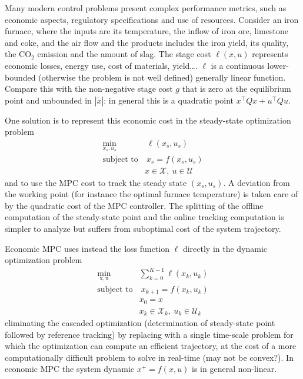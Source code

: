 \documentclass[11pt]{report}
\newcommand{\bs}[1]{\boldsymbol{#1}}
\newcommand{\bsu}{\bs{\mathrm{u}}}
\newcommand{\bsx}{\bs{\mathrm{x}}}
\begin{document}
Many modern control problems present complex performance metrics, such as economic aspects, regulatory specifications and use of resources. Consider an iron furnace, where the inputs are its temperature, the inflow of iron ore, limestone and coke, and the air flow and the products includes the iron yield, its quality, the CO$_2$ emission and the amount of slag. The stage cost $\ell(x,u)$ represents economic losses, energy use, cost of materials, yield\ldots. $\ell$ is a continuous lower-bounded (otherwise the problem is not well defined) generally linear function. Compare this with the non-negative stage cost $g$ that is zero at the equilibrium point and unbounded in $|\tilde{x}|$: in general this is a quadratic point $x^\top Q x + u^\top Q u$.

One solution is to represent this economic cost in the steady-state optimization problem
\begin{align*}
  \min_{x_s,u_s} &\ \ell(x_s,u_s) \\
  \text{subject to} &\ x_s = f(x_s,u_s) \\
                 & x\in \mathcal{X},\ u\in \mathcal{U}
\end{align*}
and to use the MPC cost to track the steady state $(x_s,u_s)$. A deviation from the working point (for instance the optimal furnace temperature) is taken care of by the quadratic cost of the MPC controller. The splitting of the offline computation of the steady-state point and the online tracking computation is simpler to analyze but suffers from suboptimal cost of the system trajectory.

Economic MPC uses instead the loss function $\ell$ directly in the dynamic optimization problem
\begin{align*}
  \min_{\bsx,\bsu} & \sum_{k=0}^{K-1} \ell(x_k,u_k) \\
  \text{subject to} &\ x_{k+1} = f(x_k,u_k) \\
                   & x_0 = x \\
                   & x_k\in \mathcal{X}_k,\ u_k\in \mathcal{U}_k
\end{align*}
eliminating the cascaded optimization (determination of steady-state point followed by reference tracking) by replacing with a single time-scale problem for which the optimization can compute an efficient trajectory, at the cost of a more computationally difficult problem to solve in real-time (may not be convex?). In economic MPC the system dynamic $x^+=f(x,u)$ is in general non-linear.
\end{document}
